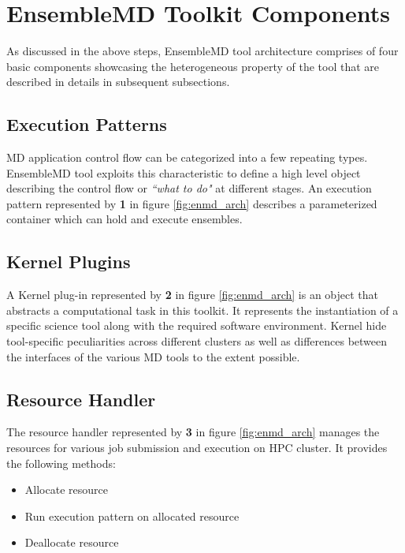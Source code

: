 \documentclass[10pt]{ruthesis}
\begin{document}
\section{EnsembleMD Toolkit Components}
As discussed in the above steps, EnsembleMD tool architecture comprises of four basic components showcasing the heterogeneous property of the tool that are described in details in subsequent subsections.

\subsection{Execution Patterns}
MD application control flow can be categorized into a few repeating types. EnsembleMD tool exploits this characteristic to define a high level object describing the control flow or {\em``what to do"} at different stages. An execution pattern represented by \textbf{{1}} in figure \ref{fig:enmd_arch} describes a parameterized container which can hold and execute ensembles. 

\subsection{Kernel Plugins}
A Kernel plug-in represented by \textbf{{2}} in figure \ref{fig:enmd_arch} is an object that abstracts a computational task in this toolkit. It represents the instantiation of a specific science tool along with the required software environment. Kernel hide tool-specific peculiarities across different clusters as well as differences between the interfaces of the various MD tools to the extent possible. 

\subsection{Resource Handler}
The resource handler represented by \textbf{{3}} in figure \ref{fig:enmd_arch} manages the resources for various job submission and execution on HPC cluster. It provides the following methods:
\begin{itemize}
	\item Allocate resource
	\item Run execution pattern on allocated resource
	\item Deallocate resource
\end{itemize}
\end{document}
